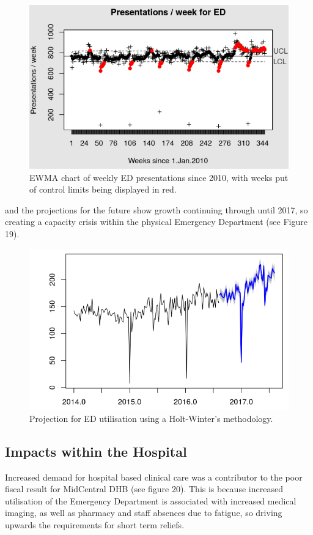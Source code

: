 \documentclass[11pt,a4paper]{article}
\begin{document}
\begin{figure}[htp]
\centering
\includegraphics[scale=0.70]{EWMA_ED_pesentations.png}
\caption{EWMA chart of weekly ED presentations since 2010, with weeks put of control limits being displayed in red.}
\label{EWMA statistical process chart of ED presentations}
\end{figure}


and the projections for the future show growth continuing through until 2017, so creating a capacity crisis within the physical Emergency Department (see Figure 19).\\


\begin{figure}[htp]
\centering
\includegraphics[scale=0.70]{HW_projections.png}
\caption{Projection for ED utilisation using a Holt-Winter's methodology.}
\label{Projections for ED utilisation through to 2017}
\end{figure}


\subsection{Impacts within the Hospital}
Increased demand for hospital based clinical care was a contributor to the poor fiscal result for MidCentral DHB (see figure 20). This is because increased utilisation of the Emergency Department is associated with increased medical imaging, as well as pharmacy and staff absences due to fatigue, so driving upwards the requirements for short term reliefs.\\
\end{document}
